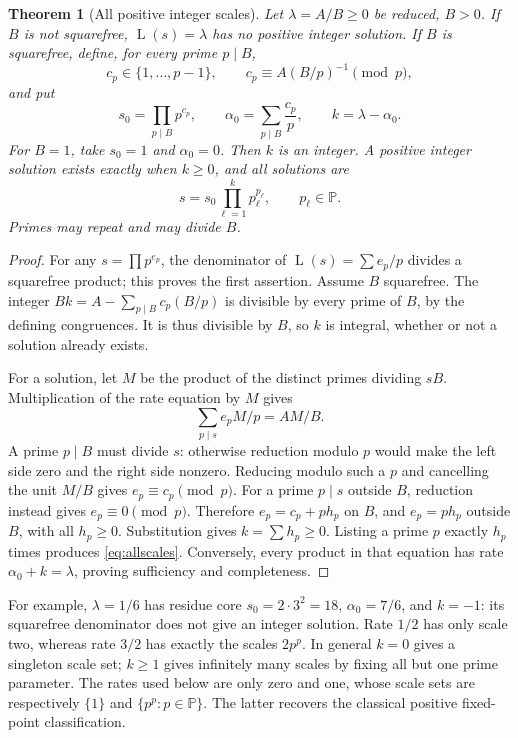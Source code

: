 \documentclass[11pt]{article}
\newcommand{\Lrate}{\operatorname{L}}
\newcommand{\PP}{\mathbb{P}}
\newtheorem{theorem}{Theorem}[section]
\theoremstyle{definition}
\theoremstyle{remark}
\begin{document}
\begin{theorem}[All positive integer scales]\label{thm:core}
Let $\lambda=A/B\ge0$ be reduced, $B>0$.
If $B$ is not squarefree, $\Lrate(s)=\lambda$ has no positive integer
solution. If $B$ is squarefree, define, for every prime $p\mid B$,
\[
 c_p\in\{1,\ldots,p-1\},\qquad
 c_p\equiv A(B/p)^{-1}\pmod p,
\]
and put
\begin{equation}\label{eq:core}
 s_0=\prod_{p\mid B}p^{c_p},\qquad
 \alpha_0=\sum_{p\mid B}\frac{c_p}{p},\qquad k=\lambda-\alpha_0.
\end{equation}
For $B=1$, take $s_0=1$ and $\alpha_0=0$. Then $k$ is an integer.
A positive integer solution exists exactly when $k\ge0$, and all
solutions are
\begin{equation}\label{eq:allscales}
 s=s_0\prod_{\ell=1}^{k}p_\ell^{p_\ell},\qquad p_\ell\in\PP.
\end{equation}
Primes may repeat and may divide $B$.
\end{theorem}
\begin{proof}
For any $s=\prod p^{e_p}$, the denominator of $\Lrate(s)=\sum e_p/p$
divides a squarefree product; this proves the first assertion.
Assume $B$ squarefree. The integer
$Bk=A-\sum_{p\mid B}c_p(B/p)$ is divisible by every prime of $B$,
by the defining congruences. It is thus divisible by $B$, so $k$ is
integral, whether or not a solution already exists.

For a solution, let $M$ be the product of the distinct primes dividing
$sB$. Multiplication of the rate equation by $M$ gives
\[
 \sum_{p\mid s}e_p M/p=A M/B.
\]
A prime $p\mid B$ must divide $s$: otherwise reduction modulo $p$
would make the left side zero and the right side nonzero.
Reducing modulo such a $p$ and cancelling the unit $M/B$ gives
$e_p\equiv c_p\pmod p$. For a prime $p\mid s$ outside $B$,
reduction instead gives $e_p\equiv0\pmod p$.
Therefore
$e_p=c_p+ph_p$ on $B$, and $e_p=ph_p$ outside $B$, with
all $h_p\ge0$. Substitution gives $k=\sum h_p\ge0$.
Listing a prime $p$ exactly $h_p$ times produces
\eqref{eq:allscales}. Conversely, every product in that equation has
rate $\alpha_0+k=\lambda$, proving sufficiency and completeness.
\end{proof}

For example, $\lambda=1/6$ has residue core $s_0=2\cdot3^2=18$,
$\alpha_0=7/6$, and $k=-1$: its squarefree denominator does not
give an integer solution. Rate $1/2$ has only scale two, whereas rate
$3/2$ has exactly the scales $2p^p$. In general $k=0$ gives a singleton
scale set; $k\ge1$ gives infinitely many scales by fixing all but one
prime parameter. The rates used below are only zero and one, whose
scale sets are respectively $\{1\}$ and $\{p^p:p\in\PP\}$.
The latter recovers the classical positive fixed-point classification.
\end{document}
